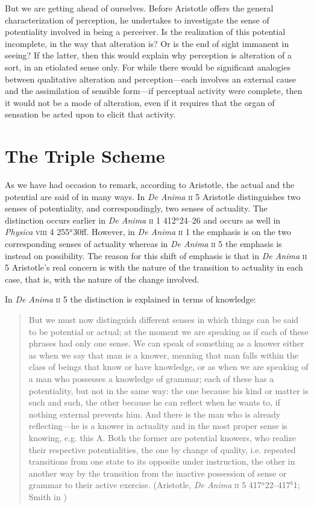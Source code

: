 But we are getting ahead of ourselves. Before Aristotle offers the general characterization of perception, he undertakes to investigate the sense of potentiality involved in being a perceiver. Is the realization of this potential incomplete, in the way that alteration is? Or is the end of sight immanent in seeing? If the latter, then this would explain why perception is alteration of a sort, in an etiolated sense only. For while there would be significant analogies between qualitative alteration and perception---each involves an external cause and the assimilation of sensible form---if perceptual activity were complete, then it would not be a mode of alteration, even if it requires that the organ of sensation be acted upon to elicit that activity.


\section{The Triple Scheme} %
\label{sec:the_triple_scheme}

As we have had occasion to remark, according to Aristotle, the actual and the potential are said of in many ways. In \emph{De Anima} \textsc{ii} 5 Aristotle distinguishes two senses of potentiality, and correspondingly, two senses of actuality. The distinction occurs earlier in \emph{De Anima} \textsc{ii} 1 412\( ^{a} \)24--26 and occurs as well in \emph{Physica} \textsc{viii} 4 255\( ^{a} \)30ff. However, in \emph{De Anima} \textsc{ii} 1 the emphasis is on the two corresponding senses of actuality whereas in \emph{De Anima} \textsc{ii} 5 the emphasis is instead on possibility. The reason for this shift of emphasis is that in \emph{De Anima} \textsc{ii} 5 Aristotle's real concern is with the nature of the transition to actuality in each case, that is, with the nature of the change involved.  

In \emph{De Anima} \textsc{ii} 5 the distinction is explained in terms of knowledge:
\begin{quote}
	But we must now distinguish different senses in which things can be said to be potential or actual; at the moment we are speaking as if each of these phrases had only one sense. We can speak of something as a knower either as when we say that man is a knower, meaning that man falls within the class of beings that know or have knowledge, or as when we are speaking of a man who possesses a knowledge of grammar; each of these has a potentiality, but not in the same way: the one because his kind or matter is such and such, the other because he can reflect when he wants to, if nothing external prevents him. And there is the man who is already reflecting---he is a knower in actuality and in the most proper sense is knowing, e.g. this A. Both the former are potential knowers, who realize their respective potentialities, the one by change of quality, i.e. repeated transitions from one state to its opposite under instruction, the other in another way by the transition from the inactive possession of sense or grammar to their active exercise. (Aristotle, \emph{De Anima} \textsc{ii} 5 417\( ^{a} \)22--417\( ^{b} \)1; Smith in \citealt[30]{Barnes:1984uq})
\end{quote}

